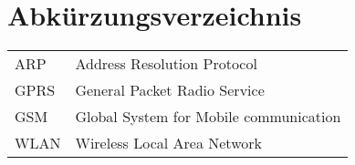 \section*{Abkürzungsverzeichnis}

\begin{table*}[htbp]
		\begin{tabular}{ll}
			ARP & Address Resolution Protocol \\
			GPRS & General Packet Radio Service \\
			GSM  &  Global System for Mobile communication \\
			WLAN & Wireless Local Area Network \\
		\end{tabular}
\end{table*}
